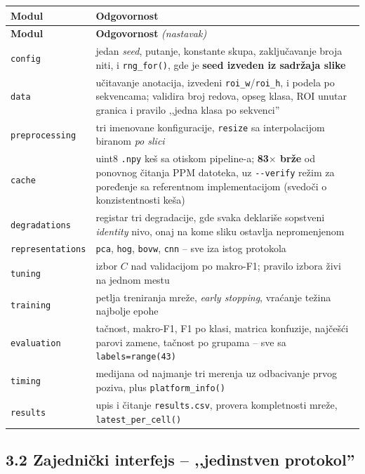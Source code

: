 \documentclass[11pt,a4paper]{article}
\begin{document}
\begin{longtable}{|>{\raggedright\arraybackslash}p{2.9cm}|>{\raggedright\arraybackslash}p{12.9cm}|}
\hline
\textbf{Modul} & \textbf{Odgovornost} \\
\hline
\endfirsthead
\hline
\textbf{Modul} & \textbf{Odgovornost} \quad \emph{(nastavak)} \\
\hline
\endhead
\texttt{config} & jedan \textit{seed}, putanje, konstante skupa, zaključavanje broja niti, i \texttt{rng\_for()}, gde je \textbf{seed izveden iz sadržaja slike} \\
\hline
\texttt{data} & učitavanje anotacija, izvedeni \texttt{roi\_w}/\texttt{roi\_h}, i podela po sekvencama; validira broj redova, opseg klasa, ROI unutar granica i pravilo ,,jedna klasa po sekvenci'' \\
\hline
\texttt{preprocessing} & tri imenovane konfiguracije, \texttt{resize} sa interpolacijom biranom \emph{po slici} \\
\hline
\texttt{cache} & uint8 \texttt{.npy} keš sa otiskom pipeline-a; \textbf{83$\times$ brže} od ponovnog čitanja PPM datoteka, uz \texttt{-{}-verify} režim za poređenje sa referentnom implementacijom (svedoči o konzistentnosti keša) \\
\hline
\texttt{degradations} & registar tri degradacije, gde svaka deklariše sopstveni \textit{identity} nivo, onaj na kome sliku ostavlja nepromenjenom \\
\hline
\texttt{representations} & \texttt{pca}, \texttt{hog}, \texttt{bovw}, \texttt{cnn} -- sve iza istog protokola \\
\hline
\texttt{tuning} & izbor $C$ nad validacijom po makro-F1; pravilo izbora živi na jednom mestu \\
\hline
\texttt{training} & petlja treniranja mreže, \textit{early stopping}, vraćanje težina najbolje epohe \\
\hline
\texttt{evaluation} & tačnost, makro-F1, F1 po klasi, matrica konfuzije, najčešći parovi zamene, tačnost po grupama -- sve sa \texttt{labels=range(43)} \\
\hline
\texttt{timing} & medijana od najmanje tri merenja uz odbacivanje prvog poziva, plus \texttt{platform\_info()} \\
\hline
\texttt{results} & upis i čitanje \texttt{results.csv}, provera kompletnosti mreže, \texttt{latest\_per\_cell()} \\
\hline
\end{longtable}

\subsection*{3.2 Zajednički interfejs -- ,,jedinstven protokol''}
\end{document}

